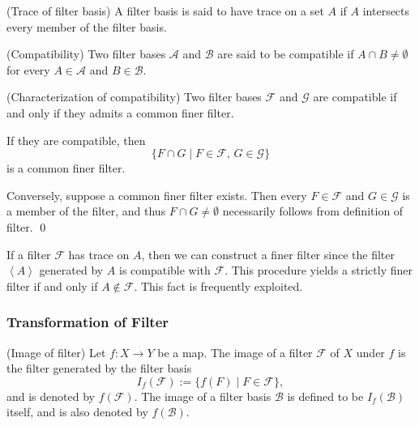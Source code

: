 \documentclass{article}
\begin{document}
\begin{dfn} (Trace of filter basis)
    A filter basis is said to have trace on a set \( A \) if \( A \) intersects every member of the filter basis.
\end{dfn}

\begin{dfn} (Compatibility)
    Two filter bases \( \mathscr{A} \) and \( \mathscr{B} \) are said to be compatible if \( A \cap B \neq \emptyset \) for every \( A \in \mathscr{A} \) and \( B \in \mathscr{B} \).
\end{dfn}

\begin{prp}\label{compatible} (Characterization of compatibility)
    Two filter bases \( \mathscr{F} \) and \( \mathscr{G} \) are compatible if and only if they admits a common finer filter.
\end{prp}
\begin{prf}
    If they are compatible, then
    \begin{equation*}
        \{F \cap G \mid F \in \mathscr{F},\,G \in \mathscr{G}\}
    \end{equation*}
    is a common finer filter.

    Conversely, suppose a common finer filter exists. Then every \( F \in \mathscr{F} \) and \( G \in \mathscr{G} \) is a member of the filter, and thus \( F \cap G \neq \emptyset \) necessarily follows from definition of filter.
    \qed\end{prf}

\begin{rem}\label{rem trace}
    If a filter \( \mathscr{F} \) has trace on \( A \), then we can construct a finer filter since the filter \( \left< A \right> \) generated by \( A \) is compatible with \( \mathscr{F} \). This procedure yields a strictly finer filter if and only if \( A \notin \mathscr{F}\). This fact is frequently exploited.
\end{rem}

\subsubsection{Transformation of Filter} \label{transformation of filter}

\begin{dfn} (Image of filter)
    Let \( f:X \to Y \) be a map.
    The image of a filter \( \mathscr{F} \) of \( X \) under \( f \) is the filter generated by the filter basis
    \begin{equation*}
        I_f(\mathscr{F}):=\{f(F) \mid F \in \mathscr{F}\},
    \end{equation*}
    and is denoted by \( f(\mathscr{F}) \). The image of a filter basis \( \mathscr{B} \) is defined to be \( I_f(\mathscr{B}) \) itself, and is also denoted by \( f(\mathscr{B}) \).
\end{dfn}
\end{document}
